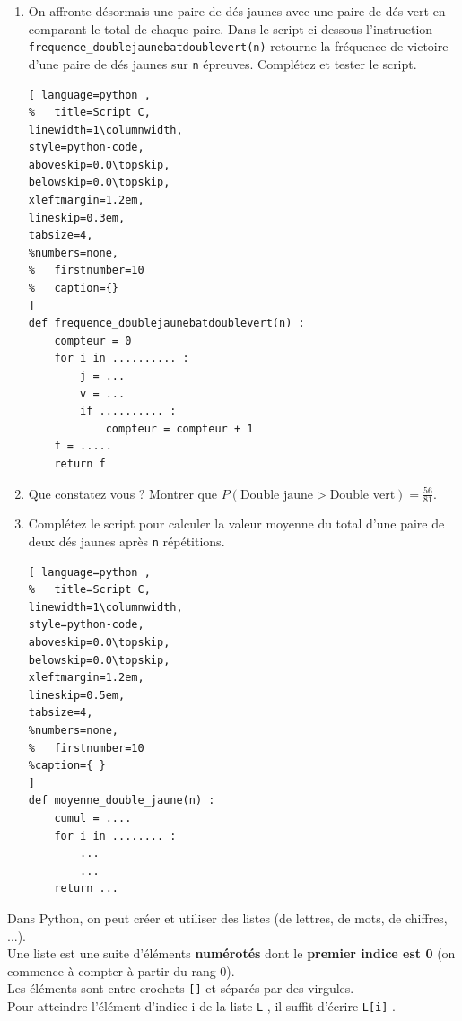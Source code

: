 \documentclass[main.tex]{subfiles}
\begin{document}
\begin{exercise}
\begin{enumerate}[label=\arabic*),leftmargin=*]
\begin{lstlisting}[ language=python , 
%	title=Script C,   
linewidth=1\columnwidth,
style=python-code,    
aboveskip=0.0\topskip,
belowskip=0.0\topskip,
xleftmargin=1.2em,
lineskip=0.3em,
tabsize=4, 
%numbers=none,
%	firstnumber=10  
%	caption={}
]  
def frequence_jaunebatvert(n) :	
	compteur = 0
	for i in .......... :
		j = ...
		v = ...
		if .......... :
			compteur = compteur + 1
	f = .....
	return f
\end{lstlisting} 
\item On affronte désormais une paire de dés jaunes avec une paire de dés vert en comparant le total de chaque paire. Dans le script ci-dessous l'instruction \lstinline|frequence_doublejaunebatdoublevert(n)| retourne la fréquence de victoire d'une paire de dés jaunes sur \lstinline|n| épreuves. Complétez et tester le script.
\begin{lstlisting}[ language=python , 
%	title=Script C,   
linewidth=1\columnwidth,
style=python-code,    
aboveskip=0.0\topskip,
belowskip=0.0\topskip,
xleftmargin=1.2em,
lineskip=0.3em,
tabsize=4, 
%numbers=none,
%	firstnumber=10  
%	caption={}
]  
def frequence_doublejaunebatdoublevert(n) :	
	compteur = 0
	for i in .......... :
		j = ...
		v = ...
		if .......... :
			compteur = compteur + 1		
	f = .....
	return f
\end{lstlisting} 
\item Que constatez vous ? Montrer que $P(\text{Double jaune}>\text{Double vert})=\tfrac{56}{81}$.
\item  	  Complétez le script pour calculer la valeur moyenne du total d'une paire de deux dés jaunes après \lstinline|n| répétitions. 
\begin{lstlisting}[ language=python , 
%	title=Script C,   
linewidth=1\columnwidth,
style=python-code,    
aboveskip=0.0\topskip,
belowskip=0.0\topskip,
xleftmargin=1.2em,
lineskip=0.5em,
tabsize=4, 
%numbers=none,
%	firstnumber=10  
%caption={ }
]  
def moyenne_double_jaune(n) :	
	cumul = ....
	for i in ........ :
		...
		...
	return ...
\end{lstlisting}  
\end{enumerate}
\end{exercise}  
%	 
\newpage 
\begin{eBox}
Dans Python, on peut créer et utiliser des listes (de lettres, de mots, de chiffres, ...).\\ 
\noindent Une liste est une suite d’éléments \textbf{numérotés} dont le \textbf{premier indice est 0} (on commence à compter à partir du rang 0).\\ Les éléments sont entre crochets \lstinline|[]| et séparés par des virgules.\\ 
Pour atteindre l’élément d’indice \og i \fg{} de la liste \og  \lstinline|L| \fg{}, il suffit d’écrire  \og  \lstinline|L[i]| \fg{}. 
\end{eBox}
\end{document}
